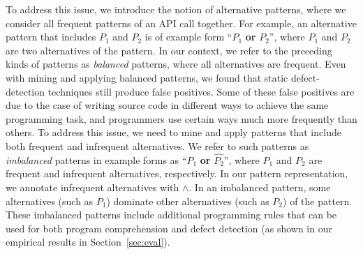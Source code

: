 To address this issue, we introduce the notion of alternative patterns, where we consider all frequent patterns of an API call together. For example, an alternative pattern that includes $P_1$ and $P_2$ is of example form ``$P_1$ \textbf{or} $P_2$'', where $P_1$ and $P_2$ are two alternatives of the pattern. In our context, we refer to the preceding kinds of patterns as \emph{balanced} patterns, where all alternatives are frequent. Even with mining and applying balanced patterns, we found that static defect-detection techniques still produce false positives. Some of these false positives are due to the case of writing source code in different ways to achieve the same programming task, and programmers use certain ways much more frequently than others. To address this issue, we need to mine and apply patterns that include both frequent and infrequent alternatives. We refer to such patterns as \emph{imbalanced} patterns in example forms as ``$P_1$ \textbf{or} $\hat{P_2}$'',  where $P_1$ and $P_2$ are frequent and infrequent alternatives, respectively. In our pattern representation, we annotate infrequent alternatives with $\wedge$. In an imbalanced pattern, some alternatives (such as $P_1$) dominate other alternatives (such as $P_2$) of the pattern. These imbalanced patterns include additional 
programming rules that can be used for both program comprehension and defect detection (as shown in our empirical results in Section~\ref{sec:eval}). 

